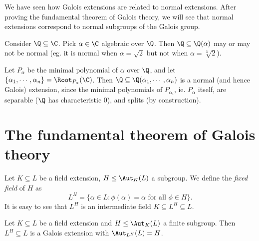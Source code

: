 \documentclass[a4paper]{article}
\begin{document}
We have seen how Galois extensions are related to normal extensions. After proving the fundamental theorem of Galois theory, we will see that normal extensions correspond to normal subgroups of the Galois group.

\begin{eg}
  Consider $\Q \subseteq \C$. Pick $\alpha \in \C$ algebraic over $\Q$. Then $\Q \subseteq \Q(\alpha)$ may or may not be normal (eg. it is normal when $\alpha = \sqrt{2}$ but not when $\alpha = \sqrt[3]{2}$).

  Let $P_\alpha$ be the minimal polynomial of $\alpha$ over $\Q$, and let $\{\alpha_1, \cdots, \alpha_n\} = \Root_{P_\alpha}(\C)$. Then $\Q\subseteq \Q(\alpha_1, \cdots, \alpha_n)$ is a normal (and hence Galois) extension, since the minimal polynomials of $P_{\alpha_i}$, ie. $P_\alpha$ itself, are separable ($\Q$ has characteristic 0), and splits (by construction).
\end{eg}
\section{The fundamental theorem of Galois theory}
\begin{defi}
  Let $K\subseteq L$ be a field extension, $H\leq \Aut_K(L)$ a subgroup. We define the \emph{fixed field} of $H$ as
  \[
    L^H = \{\alpha \in L: \phi(\alpha) = \alpha\text{ for all }\phi \in H\}.
  \]
  It is easy to see that $L^H$ is an intermediate field $K\subseteq L^H \subseteq L$.
\end{defi}

\begin{lemma}
  Let $K\subseteq L$ be a field extension and $H\leq \Aut_K(L)$ a finite subgroup. Then $L^H\subseteq L$ is a Galois extension with $\Aut_{L^H}(L) = H$.
\end{lemma}
\end{document}
